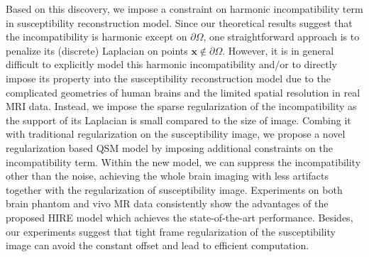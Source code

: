 \documentclass[reqno]{siamonline1116}
\numberwithin{theorem}{section}
\numberwithin{equation}{section}
\def\Om{\Omega}
\def\p{\partial}
\def\x{\boldsymbol{x}}
\begin{document}

Based on this discovery, we impose a constraint on harmonic incompatibility term in susceptibility reconstruction model. Since our theoretical results suggest that the incompatibility is harmonic except on $\p\Om$, one straightforward approach is to penalize its (discrete) Laplacian on points $\x\notin\p\Om$. However, it is in general difficult to explicitly model this harmonic incompatibility and/or to directly impose its property into the susceptibility reconstruction model due to the complicated geometries of human brains and the limited spatial resolution in real MRI data. Instead, we impose the sparse regularization of the incompatibility as the support of its Laplacian is small compared to the size of image. Combing it with traditional regularization on the susceptibility image, we propose a novel regularization based QSM model by imposing additional constraints on the incompatibility term. Within the new model, we can suppress the incompatibility other than the noise, achieving the whole brain imaging with less artifacts together with the regularization of susceptibility image. Experiments on both brain phantom and vivo MR data consistently show the advantages of the proposed HIRE model which achieves the state-of-the-art performance. Besides, our experiments suggest that tight frame regularization of the susceptibility image can avoid the constant offset \cite{Y.Kee2017} and lead to efficient computation.
\end{document}
